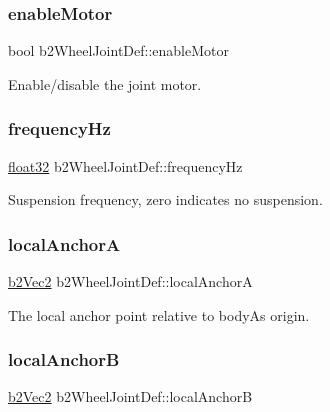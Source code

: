 \subsubsection{\texorpdfstring{enableMotor}{enableMotor}}
{\footnotesize\ttfamily bool b2\+Wheel\+Joint\+Def\+::enable\+Motor}



Enable/disable the joint motor. 

\mbox{\label{structb2_wheel_joint_def_acf3540f46eaf3bc91426386939bd37b1}} 
\subsubsection{\texorpdfstring{frequencyHz}{frequencyHz}}
{\footnotesize\ttfamily \mbox{\hyperlink{b2_settings_8h_aacdc525d6f7bddb3ae95d5c311bd06a1}{float32}} b2\+Wheel\+Joint\+Def\+::frequency\+Hz}



Suspension frequency, zero indicates no suspension. 

\mbox{\label{structb2_wheel_joint_def_a9429d2273bfdd8bdc0db416e73b89ae4}} 
\subsubsection{\texorpdfstring{localAnchorA}{localAnchorA}}
{\footnotesize\ttfamily \mbox{\hyperlink{structb2_vec2}{b2\+Vec2}} b2\+Wheel\+Joint\+Def\+::local\+AnchorA}



The local anchor point relative to bodyA\textquotesingle{}s origin. 

\mbox{\label{structb2_wheel_joint_def_a88ba0f7108076b9d7ced68425be95c27}} 
\subsubsection{\texorpdfstring{localAnchorB}{localAnchorB}}
{\footnotesize\ttfamily \mbox{\hyperlink{structb2_vec2}{b2\+Vec2}} b2\+Wheel\+Joint\+Def\+::local\+AnchorB}



